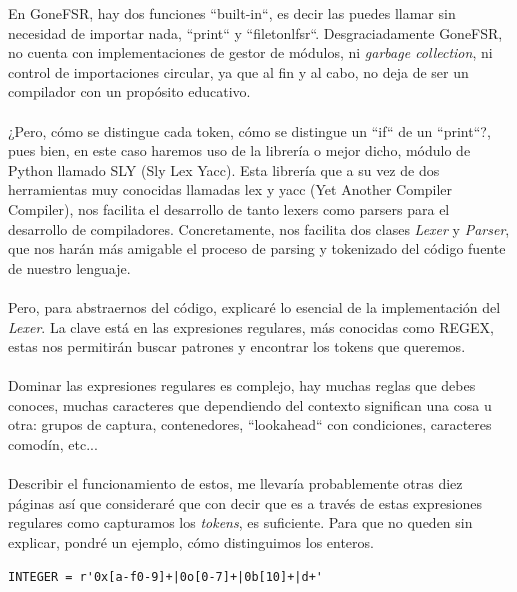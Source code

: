 En GoneFSR, hay dos funciones ``built-in``, es decir las puedes llamar sin necesidad de importar nada, ``print`` y ``filetonlfsr``. Desgraciadamente GoneFSR, no cuenta con implementaciones de gestor de módulos, ni \textit{garbage collection}, ni control de importaciones circular, ya que al fin y al cabo, no deja de ser un compilador con un propósito educativo.\\\\
\newpage
\noindent ¿Pero, cómo se distingue cada token, cómo se distingue un ``if`` de un  ``print``?, pues bien, en este caso haremos uso de la librería o mejor dicho, módulo de Python llamado SLY (Sly Lex Yacc). Esta librería que a su vez de dos herramientas muy conocidas llamadas lex y yacc (Yet Another Compiler Compiler), nos facilita el desarrollo de tanto lexers como parsers para el desarrollo de compiladores. Concretamente, nos facilita dos clases  \textit{Lexer} y \textit{Parser}, que nos harán más amigable el proceso de parsing y tokenizado del código fuente de nuestro lenguaje. \\\\
Pero, para abstraernos del código, explicaré lo esencial de la implementación del \textit{Lexer}. La clave está en las expresiones regulares, más conocidas como REGEX, estas nos permitirán buscar patrones y encontrar los tokens que queremos.\\\\
Dominar las expresiones regulares es complejo, hay muchas reglas que debes conoces, muchas caracteres que dependiendo del contexto significan una cosa u otra: grupos de captura, contenedores, ``lookahead`` con condiciones, caracteres comodín, etc... \\\\
Describir el funcionamiento de estos, me llevaría probablemente otras diez páginas así que consideraré que con decir que es a través de estas expresiones regulares como capturamos los \textit{tokens}, es suficiente. Para que no queden sin explicar, pondré un ejemplo, cómo distinguimos los enteros.
\begin{lstlisting}[style=pythonStyle]
INTEGER = r'0x[a-f0-9]+|0o[0-7]+|0b[10]+|d+'
\end{lstlisting}
